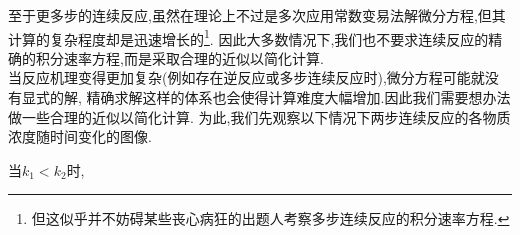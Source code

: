 \documentclass{ctexart}
\begin{document}
至于更多步的连续反应,虽然在理论上不过是多次应用常数变易法解微分方程,但其计算的复杂程度却是迅速增长的\footnote{但这似乎并不妨碍某些丧心病狂的出题人考察多步连续反应的积分速率方程.}.%
因此大多数情况下,我们也不要求连续反应的精确的积分速率方程,而是采取合理的近似以简化计算.\vspace{4pt}\\
\indent 当反应机理变得更加复杂(例如存在逆反应或多步连续反应时),微分方程可能就没有显式的解,%
精确求解这样的体系也会使得计算难度大幅增加.因此我们需要想办法做一些合理的近似以简化计算.%
为此,我们先观察以下情况下两步连续反应的各物质浓度随时间变化的图像.
\begin{figure}[H]
    \centering
\end{figure}
当$k_1<k_2$时,
\end{document}
